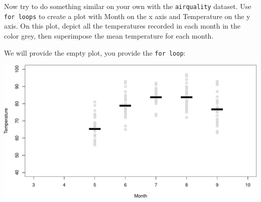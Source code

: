 \documentclass[
]{book}
\newenvironment{Shaded}{\begin{snugshade}}{\end{snugshade}}
\newcommand{\CommentTok}[1]{\textcolor[rgb]{0.56,0.35,0.01}{\textit{#1}}}
\newcommand{\ControlFlowTok}[1]{\textcolor[rgb]{0.13,0.29,0.53}{\textbf{#1}}}
\newcommand{\DataTypeTok}[1]{\textcolor[rgb]{0.13,0.29,0.53}{#1}}
\newcommand{\DecValTok}[1]{\textcolor[rgb]{0.00,0.00,0.81}{#1}}
\newcommand{\KeywordTok}[1]{\textcolor[rgb]{0.13,0.29,0.53}{\textbf{#1}}}
\newcommand{\NormalTok}[1]{#1}
\newcommand{\OperatorTok}[1]{\textcolor[rgb]{0.81,0.36,0.00}{\textbf{#1}}}
\newcommand{\StringTok}[1]{\textcolor[rgb]{0.31,0.60,0.02}{#1}}
\begin{document}
Now try to do something similar on your own with the \texttt{airquality} dataset. Use \texttt{for\ loops} to create a plot with Month on the x axis and Temperature on the y axis. On this plot, depict all the temperatures recorded in each month in the color grey, then superimpose the mean temperature for each month.

We will provide the empty plot, you provide the \texttt{for\ loop}:

\begin{Shaded}
\end{Shaded}

\includegraphics{figures/unnamed-chunk-317-1.pdf}
\end{document}
